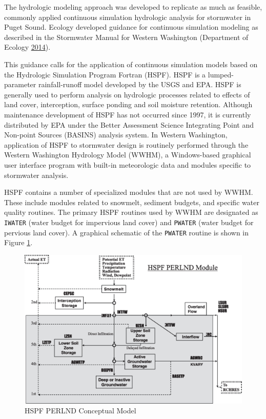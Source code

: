 \documentclass[
]{report}
\begin{document}
The hydrologic modeling approach was developed to replicate as much as feasible, commonly applied continuous simulation hydrologic analysis for stormwater in Puget Sound. Ecology developed guidance for continuous simulation modeling as described in the Stormwater Manual for Western Washington (Department of Ecology \protect\hyperlink{ref-DepartmentofEcology2014}{2014}).

This guidance calls for the application of continuous simulation models based on the Hydrologic Simulation Program Fortran (HSPF). HSPF is a lumped-parameter rainfall-runoff model developed by the USGS and EPA. HSPF is generally used to perform analysis on hydrologic processes related to effects of land cover, interception, surface ponding and soil moisture retention. Although maintenance development of HSPF has not occurred since 1997, it is currently distributed by EPA under the Better Assessment Science Integrating Point and Non-point Sources (BASINS) analysis system. In Western Washington, application of HSPF to stormwater design is routinely performed through the Western Washington Hydrology Model (WWHM), a Windows-based graphical user interface program with built-in meteorologic data and modules specific to stormwater analysis.

HSPF contains a number of specialized modules that are not used by WWHM. These include modules related to snowmelt, sediment budgets, and specific water quality routines. The primary HSPF routines used by WWHM are designated as \texttt{IWATER} (water budget for impervious land cover) and \texttt{PWATER} (water budget for pervious land cover). A graphical schematic of the \texttt{PWATER} routine is shown in Figure \ref{fig:hspfFig}.

\begin{figure}[H]
\includegraphics[width=7.33in]{images/hspf_perlnd} \caption{HSPF PERLND Conceptual Model}\label{fig:hspfFig}
\end{figure}
\end{document}
